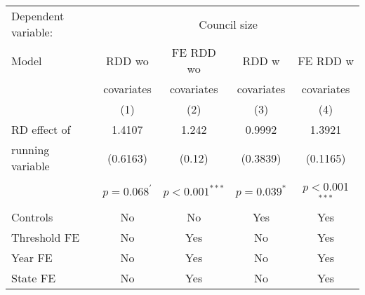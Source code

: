 \begin{tabular}{lcccc}
  \toprule
 \midrule
Dependent variable: & \multicolumn{4}{c}{Council size} \\ 
 Model & \acs{RDD} \acs{wo} & \acs{FE} \acs{RDD} \acs{wo} & \acs{RDD} \acs{w} & \acs{FE} \acs{RDD} \acs{w} \\ 
   &  covariates & covariates & covariates &  covariates \\ 
   & (1) & (2) & (3) & (4) \\ 
   \midrule
\ac{RD} effect of & 1.4107 & 1.242 & 0.9992 & 1.3921 \\ 
    running variable & (0.6163) & (0.12) & (0.3839) & (0.1165) \\ 
    & $p=0.068^{'}$ & $p<0.001^{***}$ & $p=0.039^{*}$ & $p<$0.001$^{***}$ \\ 
   \midrule
Controls & No & No & Yes & Yes \\ 
  Threshold \acs{FE} & No & Yes & No & Yes \\ 
  Year \acs{FE} & No & Yes & No & Yes \\ 
  State \acs{FE} & No & Yes & No & Yes \\ 
   \midrule
 \bottomrule
\end{tabular}
